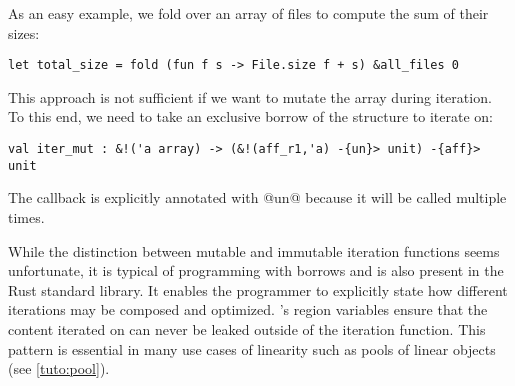 As an easy example, we fold over an array of files to compute the sum of their sizes:
\begin{lstlisting}
let total_size = fold (fun f s -> File.size f + s) &all_files 0
\end{lstlisting}

This approach is not sufficient if we want to mutate the array during iteration.
To this end, we need to take an exclusive borrow of the structure to iterate
on:
\begin{lstlisting}
val iter_mut : &!('a array) -> (&!(aff_r1,'a) -{un}> unit) -{aff}> unit
\end{lstlisting}

The callback is explicitly annotated with @un@ because  it will be called multiple times.

While the distinction between mutable and immutable iteration functions
seems unfortunate, it is typical of
programming with borrows and is also present in the Rust standard library.
It enables the programmer to explicitly state how different iterations
may be composed and optimized.
\lang's region variables ensure that the content iterated on can never
be leaked outside of the iteration function.
This pattern is essential in many use cases of linearity such
as pools of linear objects (see \cref{tuto:pool}).

\lstDeleteShortInline@

